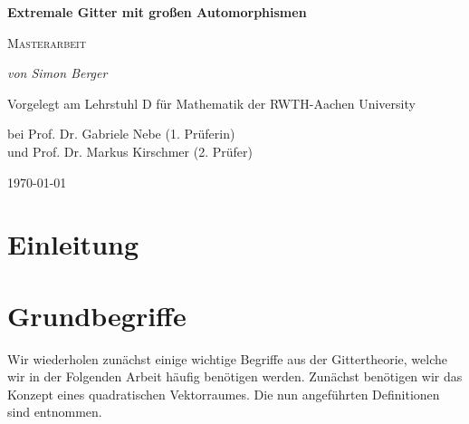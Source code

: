 \documentclass[12pt,a4paper,halfparskip,headsepline, bibtotocnumbered]{scrreprt}
\theoremstyle{nummermitklammern}
\theoremstyle{nonumberbreak}
\begin{document}

\begin{titlepage}
	\centering
	\vspace*{2cm}
	{\Large\bfseries Extremale Gitter mit großen Automorphismen\par}
	\vspace{1cm}
	{\scshape\Large Masterarbeit\par}
	\vspace{2cm}
	{\Large\itshape von Simon Berger\par}
	\vfill
	Vorgelegt am Lehrstuhl D für Mathematik der RWTH-Aachen University\par 
	bei Prof. Dr. Gabriele Nebe (1. Prüferin)\\ 
	und Prof. Dr. Markus Kirschmer (2. Prüfer)\par
	\vfill

	{\large \today\par}
\end{titlepage}


\tableofcontents

\chapter{Einleitung}



\chapter{Grundbegriffe}
Wir wiederholen zunächst einige wichtige Begriffe aus der Gittertheorie, welche wir in der Folgenden Arbeit häufig benötigen werden. Zunächst benötigen wir das Konzept eines quadratischen Vektorraumes. Die nun angeführten Definitionen sind \cite[Def. (2.1)]{kneser} entnommen.
\end{document}
